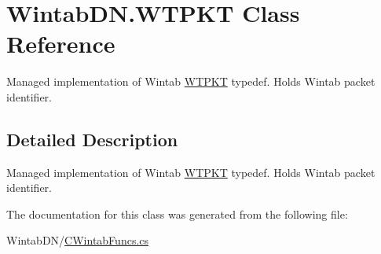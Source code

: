 \hypertarget{class_wintab_d_n_1_1_w_t_p_k_t}{}\section{Wintab\+D\+N.\+W\+T\+P\+KT Class Reference}
\label{class_wintab_d_n_1_1_w_t_p_k_t}


Managed implementation of Wintab \mbox{\hyperlink{class_wintab_d_n_1_1_w_t_p_k_t}{W\+T\+P\+KT}} typedef. Holds Wintab packet identifier.  




\subsection{Detailed Description}
Managed implementation of Wintab \mbox{\hyperlink{class_wintab_d_n_1_1_w_t_p_k_t}{W\+T\+P\+KT}} typedef. Holds Wintab packet identifier. 



The documentation for this class was generated from the following file\+:\begin{DoxyCompactItemize}
\item 
Wintab\+D\+N/\mbox{\hyperlink{_c_wintab_funcs_8cs}{C\+Wintab\+Funcs.\+cs}}\end{DoxyCompactItemize}

